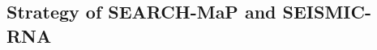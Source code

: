 \documentclass[main.tex]{subfiles}
\begin{document}
\subsection{Strategy of SEARCH-MaP and SEISMIC-RNA}

\end{document}
